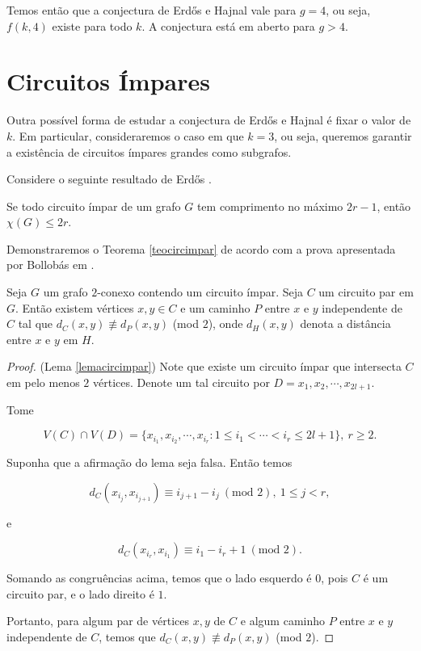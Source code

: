 Temos então que a conjectura de Erd\H{o}s e Hajnal vale para $g=4$, ou seja, $f(k,4)$ existe para todo $k$. A conjectura está em aberto para $g > 4$.

\section{Circuitos Ímpares}

Outra possível forma de estudar a conjectura de Erd\H{o}s e Hajnal é fixar o valor de $k$. Em particular, consideraremos o caso em que $k=3$, ou seja, queremos garantir a existência de circuitos ímpares grandes como subgrafos.

Considere o seguinte resultado de Erd\H{o}s \cite{erdHos1966chromatic}.

\begin{teorema}\label{teocircimpar}
Se todo circuito ímpar de um grafo $G$ tem comprimento no máximo $2r-1$, então $\chi(G) \leq 2r$.
\end{teorema}

Demonstraremos o Teorema \ref{teocircimpar} de acordo com a prova apresentada por Bollobás em \cite{bollobas2004extremal}.

\begin{lema}\label{lemacircimpar}
Seja $G$ um grafo $2$-conexo contendo um circuito ímpar. Seja $C$ um circuito par em $G$. Então existem vértices $x,y \in C$ e um caminho $P$ entre $x$ e $y$ independente de $C$ tal que $d_C(x,y) \not\equiv d_P(x,y)$ (mod $2$), onde $d_H(x,y)$ denota a distância entre $x$ e $y$ em $H$.
\end{lema}

\begin{proof}(Lema \ref{lemacircimpar})
Note que existe um circuito ímpar que intersecta $C$ em pelo menos $2$ vértices. Denote um tal circuito por $D = x_1, x_2, \cdots, x_{2l+1}$.

Tome

\[V(C) \cap V(D) = \{x_{i_1}, x_{i_2}, \cdots, x_{i_r} : 1\leq i_1 < \cdots < i_r \leq 2l+1 \},\ r\geq 2.\]

Suponha que a afirmação do lema seja falsa. Então temos

\[d_C(x_{i_j}, x_{i_{j+1}}) \equiv i_{j+1} - i_j\ (\text{mod } 2),\ 1\leq j< r,\]

e

\[d_C(x_{i_r}, x_{i_1}) \equiv i_1 - i_r + 1\ (\text{mod } 2).\]

Somando as congruências acima, temos que o lado esquerdo é $0$, pois $C$ é um circuito par, e o lado direito é $1$. 

Portanto, para algum par de vértices $x,y$ de $C$ e algum caminho $P$ entre $x$ e $y$ independente de $C$, temos que $d_C(x,y) \not\equiv d_P(x,y)$ (mod $2$).
\end{proof}

